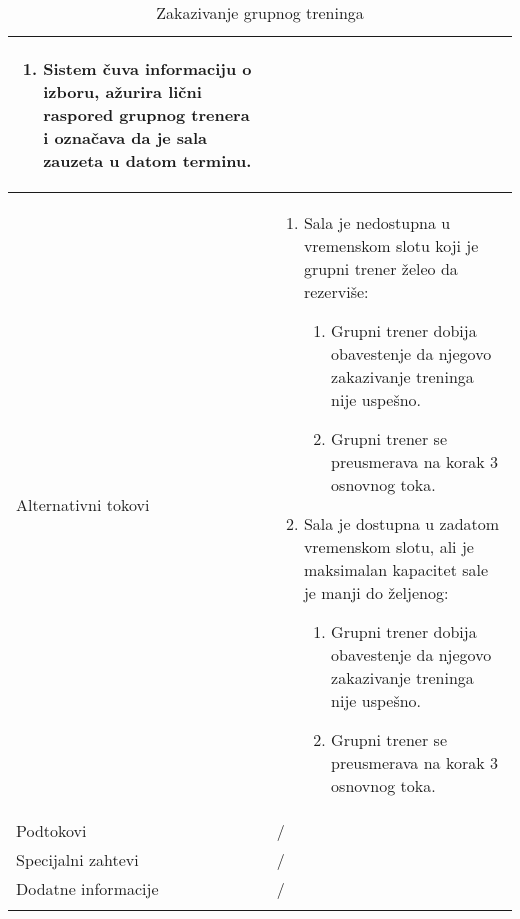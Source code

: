 \documentclass[../grupniTreninzi.tex]{subfiles}
\begin{document}
\begin{longtable}{| p{} | p{} |}
\begin{enumerate}
        \item Sistem čuva informaciju o izboru, ažurira lični raspored grupnog trenera i označava da je sala zauzeta u datom terminu.
    \end{enumerate}\\
\hline
    Alternativni tokovi & 
       \begin{enumerate}
        \item Sala je nedostupna u vremenskom slotu koji je grupni trener želeo da rezerviše:
            \begin{enumerate}
                \item Grupni trener dobija obavestenje da njegovo zakazivanje treninga nije uspešno.
                \item Grupni trener se preusmerava na korak 3 osnovnog toka.
            \end{enumerate}
        \item Sala je dostupna u zadatom vremenskom slotu, ali je maksimalan kapacitet sale je manji do željenog:
            \begin{enumerate}
                \item Grupni trener dobija obavestenje da njegovo zakazivanje treninga nije uspešno.
                \item Grupni trener se preusmerava na korak 3 osnovnog toka.
            \end{enumerate}
    \end{enumerate}\\
\hline
    Podtokovi & /\\
\hline
    Specijalni zahtevi & /\\
\hline
    Dodatne informacije & /\\
\hline
\caption{Zakazivanje grupnog treninga} %
\end{longtable}
\end{document}
